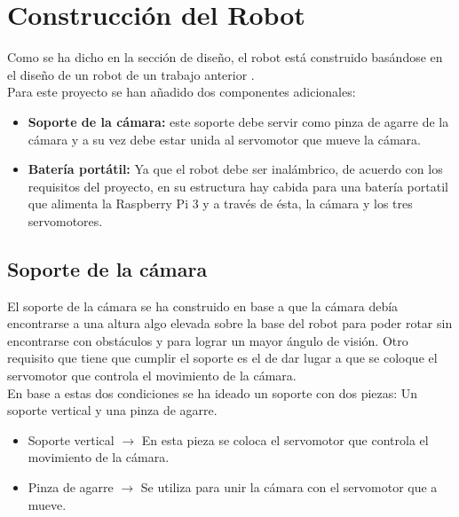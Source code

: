 \documentclass[twoside, 11pt]{epstfg}
\begin{document}
\section{Construcción del Robot}
Como se ha dicho en la sección de diseño, el robot está construido basándose en el diseño de un robot de un trabajo anterior \cite{garcia2012low}.\\
Para este proyecto se han añadido dos componentes adicionales:

\begin{itemize}
	\item \textbf{Soporte de la cámara:} este soporte debe servir como pinza de agarre de la cámara y a su vez debe estar unida al servomotor que mueve la cámara.
	\item \textbf{Batería portátil:} Ya que el robot debe ser inalámbrico, de acuerdo con los requisitos del proyecto, en su estructura hay cabida para una batería portatil que alimenta la Raspberry Pi 3 y a través de ésta, la cámara y los tres servomotores.
\end{itemize}

\subsection{Soporte de la cámara}
El soporte de la cámara se ha construido en base a que la cámara debía encontrarse a una altura algo elevada sobre la base del robot para poder rotar sin encontrarse con obstáculos y para lograr un mayor ángulo de visión. Otro requisito que tiene que cumplir el soporte es el de dar lugar a que se coloque el servomotor que controla el movimiento de la cámara.\\
En base a estas dos condiciones se ha ideado un soporte con dos piezas: Un soporte vertical y una pinza de agarre. 

\begin{itemize}
	\item Soporte vertical $\rightarrow$ En esta pieza se coloca el servomotor que controla el movimiento de la cámara.
	
	\item Pinza de agarre $\rightarrow$ Se utiliza para unir la cámara con el servomotor que a mueve.
\end{itemize}
\end{document}
